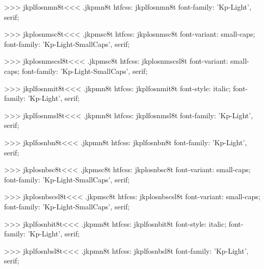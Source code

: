 >>>
\<jkplfosnmn8t\><<<
.jkpmn8t
htfcss:  jkplfosnmn8t  font-family: 'Kp-Light', serif;

>>>
\<jkplosnmsc8t\><<<
.jkpmsc8t
htfcss:  jkplosnmsc8t  font-variant: small-caps; font-family: 'Kp-Light-SmallCaps', serif;

>>>
\<jkplosnmscsl8t\><<<
.jkpmsc8t
htfcss:  jkplosnmscsl8t  font-variant: small-caps; font-family: 'Kp-Light-SmallCaps', serif;

>>>
\<jkplfosnmit8t\><<<
.jkpmn8t
htfcss:  jkplfosnmit8t  font-style: italic; font-family: 'Kp-Light', serif;

>>>
\<jkplfosnmsl8t\><<<
.jkpmn8t
htfcss:  jkplfosnmsl8t  font-family: 'Kp-Light', serif;

>>>
\<jkplfosnbn8t\><<<
.jkpmn8t
htfcss:  jkplfosnbn8t  font-family: 'Kp-Light', serif;

>>>
\<jkplosnbsc8t\><<<
.jkpmsc8t
htfcss:  jkplosnbsc8t  font-variant: small-caps; font-family: 'Kp-Light-SmallCaps', serif;

>>>
\<jkplosnbscsl8t\><<<
.jkpmsc8t
htfcss:  jkplosnbscsl8t  font-variant: small-caps; font-family: 'Kp-Light-SmallCaps', serif;

>>>
\<jkplfosnbit8t\><<<
.jkpmn8t
htfcss:  jkplfosnbit8t  font-style: italic; font-family: 'Kp-Light', serif;

>>>
\<jkplfosnbsl8t\><<<
.jkpmn8t
htfcss:  jkplfosnbsl8t  font-family: 'Kp-Light', serif;

